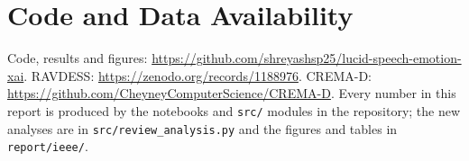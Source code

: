 \documentclass[conference]{IEEEtran}
\begin{document}
\section*{Code and Data Availability}
Code, results and figures: \url{https://github.com/shreyashsp25/lucid-speech-emotion-xai}. RAVDESS: \url{https://zenodo.org/records/1188976}. CREMA-D: \url{https://github.com/CheyneyComputerScience/CREMA-D}. Every number in this report is produced by the notebooks and \texttt{src/} modules in the repository; the new analyses are in \texttt{src/review\_analysis.py} and the figures and tables in \texttt{report/ieee/}.



\end{document}
